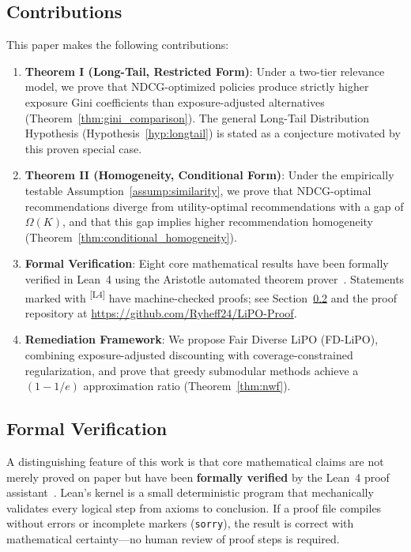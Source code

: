 \documentclass[11pt,a4paper]{article}
\theoremstyle{definition}
\theoremstyle{plain}
\theoremstyle{remark}
\newcommand{\leanmark}{\textsuperscript{\textcolor{green!50!black}{[L4]}}}
\begin{document}
\subsection{Contributions}

This paper makes the following contributions:

\begin{enumerate}[label=(\roman*)]
    \item \textbf{Theorem I (Long-Tail, Restricted Form)}: Under a two-tier relevance model, we prove that NDCG-optimized policies produce strictly higher exposure Gini coefficients than exposure-adjusted alternatives (Theorem~\ref{thm:gini_comparison}). The general Long-Tail Distribution Hypothesis (Hypothesis~\ref{hyp:longtail}) is stated as a conjecture motivated by this proven special case.
    
    \item \textbf{Theorem II (Homogeneity, Conditional Form)}: Under the empirically testable Assumption~\ref{assump:similarity}, we prove that NDCG-optimal recommendations diverge from utility-optimal recommendations with a gap of $\Omega(K)$, and that this gap implies higher recommendation homogeneity (Theorem~\ref{thm:conditional_homogeneity}).
    
    \item \textbf{Formal Verification}: Eight core mathematical results have been formally verified in Lean~4 using the Aristotle automated theorem prover~\cite{aristotle2025}. Statements marked with \leanmark{} have machine-checked proofs; see Section~\ref{subsec:formal_verification} and the proof repository at \url{https://github.com/Ryheff24/LiPO-Proof}.
    
    \item \textbf{Remediation Framework}: We propose Fair Diverse LiPO (FD-LiPO), combining exposure-adjusted discounting with coverage-constrained regularization, and prove that greedy submodular methods achieve a $(1 - 1/e)$ approximation ratio (Theorem~\ref{thm:nwf}).
\end{enumerate}

\subsection{Formal Verification}
\label{subsec:formal_verification}

A distinguishing feature of this work is that core mathematical claims are not merely proved on paper but have been \textbf{formally verified} by the Lean~4 proof assistant~\cite{lean4}. Lean's kernel is a small deterministic program that mechanically validates every logical step from axioms to conclusion. If a proof file compiles without errors or incomplete markers (\texttt{sorry}), the result is correct with mathematical certainty---no human review of proof steps is required.
\end{document}
